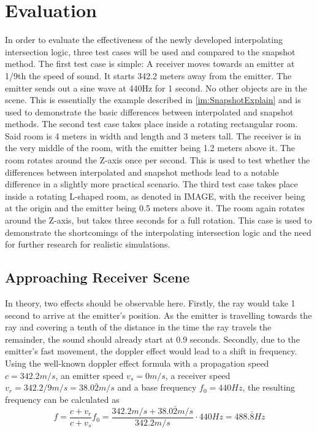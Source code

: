 \chapter{Evaluation}\label{ch:Evaluation}

In order to evaluate the effectiveness of the newly developed interpolating intersection logic,
three test cases will be used and compared to the snapshot method.
\newline
The first test case is simple: A receiver moves towards an emitter at 1/9th the speed of sound.
It starts 342.2 meters away from the emitter.
The emitter sends out a sine wave at 440Hz for 1 second.
No other objects are in the scene.
\newline
This is essentially the example described in \ref{im:SnapshotExplain}
and is used to demonstrate the basic differences between interpolated and snapshot methods.
\newline
The second test case takes place inside a rotating rectangular room.
Said room is 4 meters in width and length and 3 meters tall.
The receiver is in the very middle of the room,
with the emitter being 1.2 meters above it.
The room rotates around the Z-axis once per second.
\newline
This is used to test whether the differences between interpolated and snapshot methods
lead to a notable difference in a slightly more practical scenario.
\newline
The third test case takes place inside a rotating L-shaped room,
as denoted in IMAGE, with the receiver being at the origin
and the emitter being 0.5 meters above it.
The room again rotates around the Z-axis, but takes three seconds for a full rotation.
\newline
This case is used to demonstrate the shortcomings of the interpolating intersection logic
and the need for further research for realistic simulations.

\section{Approaching Receiver Scene}

In theory, two effects should be observable here.
\newline
Firstly, the ray would take 1 second to arrive at the emitter's position.
As the emitter is travelling towards the ray and covering a tenth of the distance in the time the ray travels the remainder,
the sound should already start at 0.9 seconds.
\newline
Secondly, due to the emitter's fast movement,
the doppler effect would lead to a shift in frequency.
\newline
Using the well-known doppler effect formula with a propagation speed \(c = 342.2 m/s\), an emitter speed \(v_s = 0 m/s\),
a receiver speed \(v_r = 342.2/9 m/s = 38.0\bar{2} m/s\) and a base frequency \(f_0 = 440 Hz\),
the resulting frequency can be calculated as
\begin{equation}\label{eq:Doppler}
    f = \frac{c + v_r}{c + v_s} f_0 = \frac{342.2 m/s + 38.0\bar{2} m/s}{342.2 m/s} \cdot 440Hz = 488.\bar{8} Hz
\end{equation}


